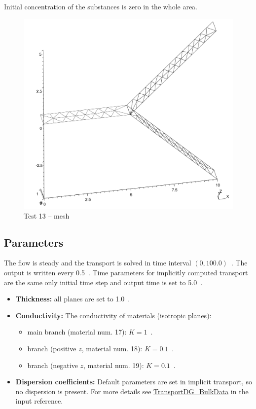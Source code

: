 Initial concentration of the substances is zero in the whole area. 
%
\begin{figure}[htb!]
\centering
\includegraphics[width=12cm]{tests_graphics/13_mesh.pdf}
\caption{Test 13 -- mesh}
\label{fig:test13_mesh}
\end{figure}
%
%
\subsection*{Parameters}
The flow is steady and the transport is solved in time interval $(0,100.0)$~. 
The output is written every 0.5~. 
Time parameters for implicitly computed transport are the same only initial time step and output time is set to 5.0~.
\begin{itemize}
  \item \textbf{Thickness:} all planes are set to 1.0~.
  \item \textbf{Conductivity:} The conductivity of materials (isotropic planes):
    \begin{itemize}
      \item main branch (material num. 17): $K=1$~.
      \item branch (positive $z$, material num. 18): $K=0.1$~.
      \item branch (negative $z$, material num. 19): $K=0.1$~.
    \end{itemize}
  \item \textbf{Dispersion coefficients:} Default parameters are set in implicit transport, so no dispersion is present. 
        For more details see \hyperlink{IT::TransportDG-BulkData}{TransportDG\_BulkData} in the input reference.
\end{itemize}

